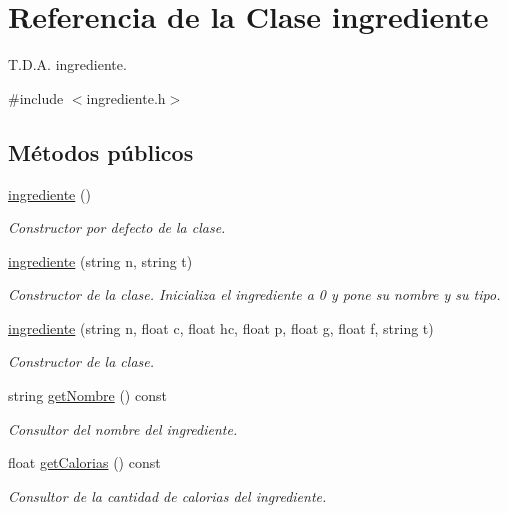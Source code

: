 \hypertarget{classingrediente}{}\section{Referencia de la Clase ingrediente}
\label{classingrediente}


T.\+D.\+A. ingrediente.  




{\ttfamily \#include $<$ingrediente.\+h$>$}

\subsection*{Métodos públicos}
\begin{DoxyCompactItemize}
\item 
\hyperlink{classingrediente_a4f2c8e16106eb4cf5a8ad9695d7a3809}{ingrediente} ()
\begin{DoxyCompactList}\small\item\em Constructor por defecto de la clase. \end{DoxyCompactList}\item 
\hyperlink{classingrediente_ac23e8df5d6df594b77de60b303e74652}{ingrediente} (string n, string t)
\begin{DoxyCompactList}\small\item\em Constructor de la clase. Inicializa el ingrediente a 0 y pone su nombre y su tipo. \end{DoxyCompactList}\item 
\hyperlink{classingrediente_a6952df43dea2eced53c3f2ce2126a39d}{ingrediente} (string n, float c, float hc, float p, float g, float f, string t)
\begin{DoxyCompactList}\small\item\em Constructor de la clase. \end{DoxyCompactList}\item 
string \hyperlink{classingrediente_a8da227d03af8811627434703922b463a}{get\+Nombre} () const
\begin{DoxyCompactList}\small\item\em Consultor del nombre del ingrediente. \end{DoxyCompactList}\item 
float \hyperlink{classingrediente_ad22b8aa7d67351699d9e208de0b7d896}{get\+Calorias} () const
\begin{DoxyCompactList}\small\item\em Consultor de la cantidad de calorias del ingrediente. \end{DoxyCompactList}\item 

\end{DoxyCompactItemize}
